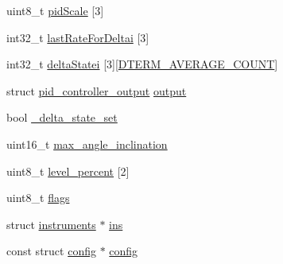 \begin{DoxyCompactItemize}
\item 
uint8\+\_\+t \hyperlink{structanglerate_a1e7b09302ddc7c322489df9eee9fdcfb}{pid\+Scale} \mbox{[}3\mbox{]}
\item 
int32\+\_\+t \hyperlink{structanglerate_ada491129c2feb4eccfa84b92686809dd}{last\+Rate\+For\+Deltai} \mbox{[}3\mbox{]}
\item 
int32\+\_\+t \hyperlink{structanglerate_a51b10e50794851dc3e8d3ed00fbeedf4}{delta\+Statei} \mbox{[}3\mbox{]}\mbox{[}\hyperlink{group__anglerate_ga383105226fdce00e3639d6ff47932a0c}{D\+T\+E\+R\+M\+\_\+\+A\+V\+E\+R\+A\+G\+E\+\_\+\+C\+O\+U\+N\+T}\mbox{]}
\item 
struct \hyperlink{structpid__controller__output}{pid\+\_\+controller\+\_\+output} \hyperlink{structanglerate_a08ef69d5fa18072c152721f424fb6136}{output}
\item 
bool \hyperlink{structanglerate_a791aca4980ff446f7f08d7aeb3cadc8c}{\+\_\+delta\+\_\+state\+\_\+set}
\item 
uint16\+\_\+t \hyperlink{structanglerate_a286815d345492397b2e70b170662db2f}{max\+\_\+angle\+\_\+inclination}
\item 
uint8\+\_\+t \hyperlink{structanglerate_a065744ff4d81802ac4df2bac10a2f64a}{level\+\_\+percent} \mbox{[}2\mbox{]}
\item 
uint8\+\_\+t \hyperlink{structanglerate_afa6209c948a30bd4e278301197293997}{flags}
\item 
struct \hyperlink{structinstruments}{instruments} $\ast$ \hyperlink{structanglerate_ab31a88423e071c1b95fde769ea6ba95e}{ins}
\item 
const struct \hyperlink{structconfig}{config} $\ast$ \hyperlink{structanglerate_a77185b9c6bf487f9230a0bdecefa7d87}{config}
\end{DoxyCompactItemize}


